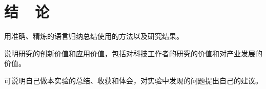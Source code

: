 \documentclass{thuemp}
\begin{document}
\section{结~~论}
用准确、精炼的语言归纳总结使用的方法以及研究结果。

说明研究的创新价值和应用价值，包括对科技工作者的研究的价值和对产业发展的价值。

可说明自己做本实验的总结、收获和体会，对实验中发现的问题提出自己的建议。



\renewcommand\refname{\heiti\wuhao\centerline{参考文献}\global\def\refname{参考文献}}
\vskip 12pt


\let\OLDthebibliography\thebibliography
\renewcommand\thebibliography[1]{
  \OLDthebibliography{#1}
  \setlength{\parskip}{0pt}
  \setlength{\itemsep}{0pt plus 0.3ex}
}

{
\renewcommand{\baselinestretch}{0.9}
\liuhao


}
\end{document}
